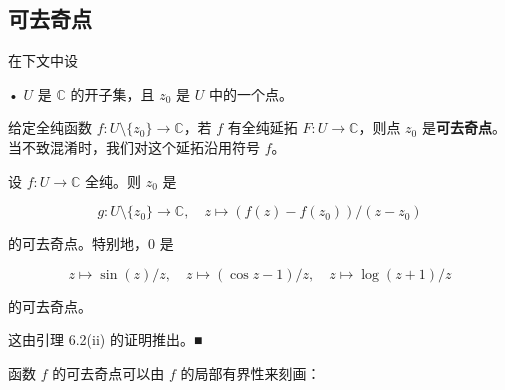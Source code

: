 \subsection*{可去奇点}

在下文中设

• $ U $ 是 $ \mathbb{C} $ 的开子集，且 $ z_{0} $ 是 $ U $ 中的一个点。

给定全纯函数 $ f : U\setminus\{z_{0}\} \to \mathbb{C} $，若 $ f $ 有全纯延拓 $ F : U \to \mathbb{C} $，则点 $ z_{0} $ 是\textbf{可去奇点}。当不致混淆时，我们对这个延拓沿用符号 $ f $。

\begin{example}

设 $ f : U \to \mathbb{C} $ 全纯。则 $ z_{0} $ 是

\[
g : U\setminus\{z_{0}\} \to \mathbb{C} , \quad z \mapsto \left(f(z) - f(z_{0})\right)/(z - z_{0})
\]

的可去奇点。特别地，0 是

\[
z \mapsto \sin(z)/z , \quad z \mapsto (\cos z - 1)/z , \quad z \mapsto \log(z + 1)/z
\]

的可去奇点。

\proofhead
这由引理 6.2(ii) 的证明推出。\nobreak\hspace{0.35em}■

函数 $ f $ 的可去奇点可以由 $ f $ 的局部有界性来刻画：
\end{example}

